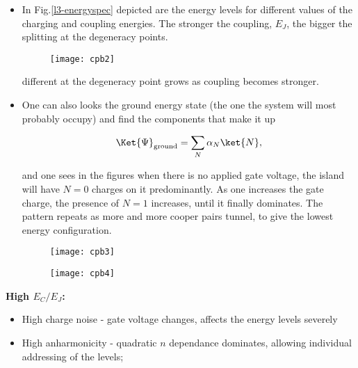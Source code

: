  \begin{itemize}
 \item In  Fig.\ref{l3-energyspec} depicted  are the energy  levels for  different values of  the charging  and coupling
   energies. The stronger the coupling, $ E_J $, the bigger the splitting at the degeneracy points.

   \begin{figure}[h]
     \centering \texttt{[image: cpb2]}
   \end{figure}

\noindent
different at the degeneracy point grows as coupling becomes stronger.\label{l3-energyspec}

\item One can also looks the ground energy state (the  one the system will most probably occupy) and find the components
  that make it up

  \[
    \Ket{\Psi}_{\text{ground}} = \sum_N\alpha_N\ket{N},
  \]

  \noindent and one sees in the  figures when there is no applied gate voltage, the island will  have $ N=0 $ charges on
  it predominantly. As one increases the gate charge, the presence of $ N=1 $ increases, until it finally dominates. The
  pattern repeats as more and more cooper pairs tunnel, to give the lowest energy configuration.

\begin{figure}[h]
  \centering \texttt{[image: cpb3]}
\end{figure}

\noindent
\begin{figure}[h]
  \centering \texttt{[image: cpb4]}
\end{figure}

\noindent

\end{itemize}

\begin{framed}\noindent
  \textbf{High $ E_C/E_J $:}
  \begin{itemize}
  \item High charge noise - gate voltage changes, affects the energy levels severely
  \item High anharmonicity - quadratic $ n $ dependance dominates, allowing individual addressing of the levels;
  \end{itemize}

\end{framed}

